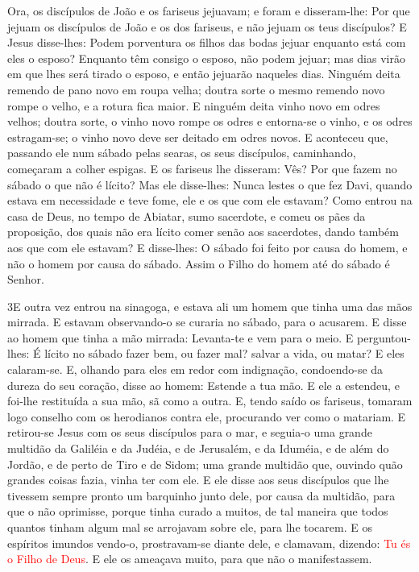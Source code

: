 Ora, os discípulos de João e os fariseus jejuavam; e foram e
disseram-lhe: Por que jejuam os discípulos de João e os dos
fariseus, e não jejuam os teus discípulos? E Jesus
disse-lhes: Podem porventura os filhos das bodas jejuar enquanto
está com eles o esposo? Enquanto têm consigo o esposo, não podem
jejuar; mas dias virão em que lhes será tirado o esposo, e
então jejuarão naqueles dias. Ninguém deita remendo de pano
novo em roupa velha; doutra sorte o mesmo remendo novo rompe o
velho, e a rotura fica maior. E ninguém deita vinho novo em
odres velhos; doutra sorte, o vinho novo rompe os odres e entorna-se
o vinho, e os odres estragam-se; o vinho novo deve ser deitado em
odres novos. E aconteceu que, passando ele num sábado pelas
searas, os seus discípulos, caminhando, começaram a colher espigas.
E os fariseus lhe disseram: Vês? Por que fazem no sábado o
que não é lícito? Mas ele disse-lhes: Nunca lestes o que fez
Davi, quando estava em necessidade e teve fome, ele e os que com ele
estavam? Como entrou na casa de Deus, no tempo de Abiatar,
sumo sacerdote, e comeu os pães da proposição, dos quais não era
lícito comer senão aos sacerdotes, dando também aos que com ele
estavam? E disse-lhes: O sábado foi feito por causa do homem,
e não o homem por causa do sábado. Assim o Filho do homem até
do sábado é Senhor.

\medskip

\lettrine{3} E outra vez entrou na sinagoga, e estava ali um
homem que tinha uma das mãos mirrada. E estavam observando-o se
curaria no sábado, para o acusarem. E disse ao homem que tinha a
mão mirrada: Levanta-te e vem para o meio. E perguntou-lhes: É
lícito no sábado fazer bem, ou fazer mal? salvar a vida, ou matar? E
eles calaram-se. E, olhando para eles em redor com indignação,
condoendo-se da dureza do seu coração, disse ao homem: Estende a tua
mão. E ele a estendeu, e foi-lhe restituída a sua mão, sã como a
outra. E, tendo saído os fariseus, tomaram logo conselho com os
herodianos contra ele, procurando ver como o matariam. E
retirou-se Jesus com os seus discípulos para o mar, e seguia-o uma
grande multidão da Galiléia e da Judéia, e de Jerusalém, e da
Iduméia, e de além do Jordão, e de perto de Tiro e de Sidom; uma
grande multidão que, ouvindo quão grandes coisas fazia, vinha ter
com ele. E ele disse aos seus discípulos que lhe tivessem sempre
pronto um barquinho junto dele, por causa da multidão, para que o
não oprimisse, porque tinha curado a muitos, de tal maneira
que todos quantos tinham algum mal se arrojavam sobre ele, para lhe
tocarem. E os espíritos imundos vendo-o, prostravam-se diante
dele, e clamavam, dizendo: \textcolor{red}{Tu és o Filho de Deus}. E
ele os ameaçava muito, para que não o manifestassem.

